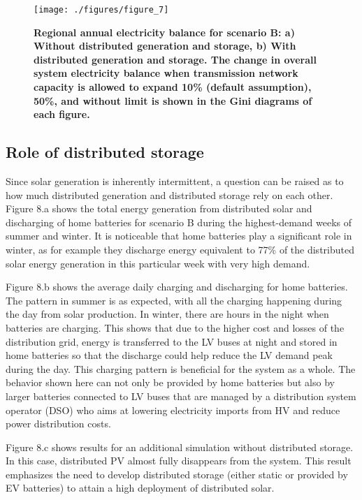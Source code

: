 \documentclass[review]{elsarticle}
\begin{document}
\begin{figure}
   \texttt{[image: ./figures/figure\_7]}
   \caption{\textbf{Regional annual electricity balance for scenario B: a) Without distributed generation and storage, b) With distributed generation and storage. The change in overall system electricity balance when transmission network capacity is allowed to expand 10\% (default assumption), 50\%, and without limit is shown in the Gini diagrams of each figure.}}
   \label{fig:balance_maps}
\end{figure}

\subsection{Role of distributed storage}

Since solar generation is inherently intermittent, a question can be raised as to how much distributed generation and distributed storage rely on each other. Figure 8.a shows the total energy generation from distributed solar and discharging of home batteries for scenario B during the highest-demand weeks of summer and winter. It is noticeable that home batteries play a significant role in winter, as for example they discharge energy equivalent to 77\% of the distributed solar energy generation in this particular week with very high demand.

Figure 8.b shows the average daily charging and discharging for home batteries. The pattern in summer is as expected, with all the charging happening during the day from solar production. In winter, there are hours in the night when batteries are charging. This shows that due to the higher cost and losses of the distribution grid, energy is transferred to the LV buses at night and stored in home batteries so that the discharge could help reduce the LV demand peak during the day. This charging pattern is beneficial for the system as a whole. The behavior shown here can not only be provided by home batteries but also by larger batteries connected to LV buses that are managed by a distribution system operator (DSO) who aims at lowering electricity imports from HV and reduce power distribution costs.

Figure 8.c shows results for an additional simulation without distributed storage. In this case, distributed PV almost fully disappears from the system. This result emphasizes the need to develop distributed storage (either static or provided by EV batteries) to attain a high deployment of distributed solar. 
\end{document}
